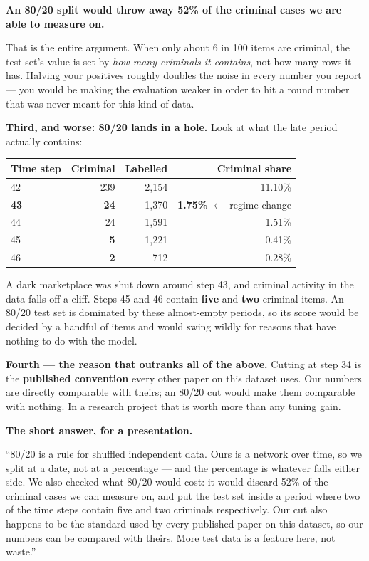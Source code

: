 \documentclass[11pt,a4paper]{article}
\begin{document}
\begin{keybox}
\textbf{An 80/20 split would throw away 52\% of the criminal cases we are able
to measure on.}

That is the entire argument. When only about 6 in 100 items are criminal, the
test set's value is set by \emph{how many criminals it contains}, not how many
rows it has. Halving your positives roughly doubles the noise in every number
you report --- you would be making the evaluation weaker in order to hit a round
number that was never meant for this kind of data.
\end{keybox}

\textbf{Third, and worse: 80/20 lands in a hole.} Look at what the late period
actually contains:

\begin{center}\small
\begin{tabular}{@{}lrrr@{}}
\toprule
\textbf{Time step} & \textbf{Criminal} & \textbf{Labelled} & \textbf{Criminal share} \\
\midrule
42 & 239 & 2{,}154 & 11.10\% \\
\textbf{43} & \textbf{24} & 1{,}370 & \textbf{1.75\%} \quad $\leftarrow$ regime change \\
44 & 24 & 1{,}591 & 1.51\% \\
45 & \textbf{5} & 1{,}221 & 0.41\% \\
46 & \textbf{2} & 712 & 0.28\% \\
\bottomrule
\end{tabular}
\end{center}

A dark marketplace was shut down around step 43, and criminal activity in the
data falls off a cliff. Steps 45 and 46 contain \textbf{five} and \textbf{two}
criminal items. An 80/20 test set is dominated by these almost-empty periods, so
its score would be decided by a handful of items and would swing wildly for
reasons that have nothing to do with the model.

\textbf{Fourth --- the reason that outranks all of the above.} Cutting at step 34
is the \textbf{published convention} every other paper on this dataset uses. Our
numbers are directly comparable with theirs; an 80/20 cut would make them
comparable with nothing. In a research project that is worth more than any
tuning gain.

\begin{plain}
\textbf{The short answer, for a presentation.}

``80/20 is a rule for shuffled independent data. Ours is a network over time, so
we split at a date, not at a percentage --- and the percentage is whatever falls
either side. We also checked what 80/20 would cost: it would discard 52\% of the
criminal cases we can measure on, and put the test set inside a period where two
of the time steps contain five and two criminals respectively. Our cut also
happens to be the standard used by every published paper on this dataset, so our
numbers can be compared with theirs. More test data is a feature here, not
waste.''
\end{plain}
\end{document}
